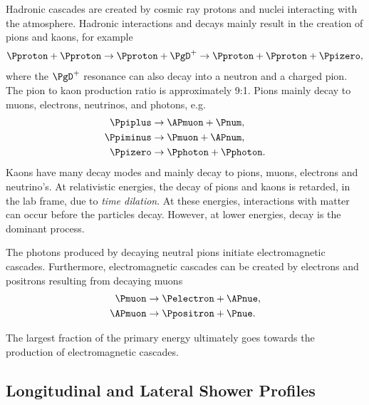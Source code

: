 Hadronic cascades are created by cosmic ray protons and nuclei interacting with
the atmosphere.  Hadronic interactions and decays mainly result in the creation
of pions and kaons, for example
\begin{equation}
\Pproton + \Pproton \to \Pproton + \PgD^+ \to \Pproton + \Pproton +
\Ppizero,
\end{equation}
where the $\PgD^+$ resonance can also decay into a neutron and a charged pion.
The pion to kaon production ratio is approximately 9:1.  Pions mainly decay to
muons, electrons, neutrinos, and photons, e.g.
\begin{equation}
\begin{split}
\Ppiplus &\to \APmuon + \Pnum, \\
\Ppiminus &\to \Pmuon + \APnum, \\
\Ppizero &\to \Pphoton + \Pphoton.
\end{split}
\end{equation}
Kaons have many decay modes \cite{Cirigliano:2012} and mainly decay to pions,
muons, electrons and neutrino's. At relativistic energies, the decay of pions and
kaons is retarded, in the lab frame, due to \emph{time dilation}. At
these energies, interactions with matter can occur before the particles decay.
However, at lower energies, decay is the dominant process.

The photons produced by decaying neutral pions initiate electromagnetic
cascades.  Furthermore, electromagnetic cascades can be created by electrons and
positrons resulting from decaying muons
\begin{equation}
\begin{split}
\Pmuon &\to \Pelectron + \APnue, \\
\APmuon &\to \Ppositron + \Pnue.
\end{split}
\end{equation}

The largest fraction of the primary energy ultimately goes towards the production
of electromagnetic cascades.


\subsection{Longitudinal and Lateral Shower Profiles}

